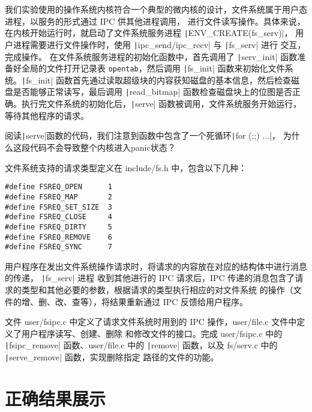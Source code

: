 我们实验使用的操作系统内核符合一个典型的微内核的设计，文件系统属于用户态进程，以服务的形式通过 IPC 供其他进程调用，
进行文件读写操作。具体来说，在内核开始运行时，就启动了文件系统服务进程 \texttt|ENV_CREATE(fs_serv)|，
用户进程需要进行文件操作时，使用 \texttt|ipc_send/ipc_recv| 与 \texttt|fs_serv| 进行
交互，完成操作。
在文件系统服务进程的初始化函数中，首先调用了 \texttt|serv_init| 函数准备好全局的文件打开记录表
\texttt{opentab}，然后调用 \texttt|fs_init| 函数来初始化文件系统。\texttt|fs_init|
函数首先通过读取超级块的内容获知磁盘的基本信息，然后检查磁盘是否能够正常读写，最后调用 \texttt|read_bitmap|
函数检查磁盘块上的位图是否正确。执行完文件系统的初始化后，\texttt|serve| 函数被调用，文件系统服务开始运行，
等待其他程序的请求。

\begin{thinking}\label{think-fs-serve}
阅读\texttt|serve|函数的代码，我们注意到函数中包含了一个死循环\texttt|for (;;) {...}|，
为什么这段代码不会导致整个内核进入panic状态？
\end{thinking}

文件系统支持的请求类型定义在 include/fs.h 中，包含以下几种：

\begin{verbatim}
#define FSREQ_OPEN      1
#define FSREQ_MAP       2
#define FSREQ_SET_SIZE  3
#define FSREQ_CLOSE     4
#define FSREQ_DIRTY     5
#define FSREQ_REMOVE    6
#define FSREQ_SYNC      7
\end{verbatim}

用户程序在发出文件系统操作请求时，将请求的内容放在对应的结构体中进行消息的传递， \texttt|fs_serv| 进程
收到其他进行的 IPC 请求后，IPC 传递的消息包含了请求的类型和其他必要的参数，根据请求的类型执行相应的对文件系统
的操作（文件的增、删、改、查等），将结果重新通过 IPC 反馈给用户程序。

\begin{exercise}
文件 user/fsipc.c 中定义了请求文件系统时用到的 IPC 操作，user/file.c 文件中定义了用户程序读写、创建、删除
和修改文件的接口。完成 user/fsipc.c 中的 \texttt|fsipc_remove| 函数、user/file.c 中的
\texttt|remove| 函数，以及 fs/serv.c 中的 \texttt|serve_remove| 函数，实现删除指定
路径的文件的功能。
\end{exercise}

\section{正确结果展示}

